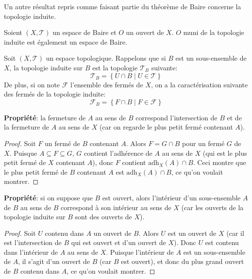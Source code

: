 Un autre résultat repris comme faisant partie du théorème de Baire concerne
la topologie induite.
\begin{thm}\label{baire:ind}
  Soient $(X, \mathcal{T})$ un espace de Baire et $O$ un ouvert de $X$.
  $O$ muni de la topologie induite est également un espace de Baire.
\end{thm}

\begin{rem}[Rappels]
  Soit $(X, \mathcal{T})$ un espace topologique.
  Rappelons que si $B$ est un sous-ensemble de $X$, la topologie
  induite sur $B$ est la topologie $\mathcal{T}_B$ suivante:
  $$\mathcal{T}_B=\left\{U\cap B\mid U\in\mathcal{T}\right\}$$
  De plus, si on note $\mathcal{F}$ l'ensemble des fermés de $X$,
  on a la caractérisation suivante des fermés de la topologie
  induite:
  $$\mathcal{F}_B=\left\{F\cap B\mid F\in\mathcal{F}\right\}$$

  \textbf{Propriété}: la fermeture de $A$ au sens de $B$ correspond
  l'intersection de $B$ et de la fermeture de $A$ au sens
  de $X$ (car on regarde le plus petit fermé contenant $A$).

  \begin{proof}
  Soit $F$ un fermé de $B$ contenant $A$. Alors
  $F = G\cap B$ pour un fermé $G$ de $X$.
  Puisque $ A \subseteq F\subseteq G$, $G$ contient
  l'adhérence de $A$ au sens de $X$
  (qui est le plus petit fermé de $X$
  contenant $A$), donc $F$ contient $\mathrm{adh}_X(A)\cap B$.
  Ceci montre que le plus petit fermé de $B$ contenant $A$
  est $\mathrm{adh}_X(A)\cap B$, ce qu'on voulait montrer.
\end{proof}

  \textbf{Propriété}: si on suppose que $B$ est ouvert, alors l'intérieur d'un
  sous-ensemble $A$ de $B$ au sens de $B$ correspond à
  son intérieur au sens de $X$
  (car les ouverts de la topologie induite sur $B$ sont des
  ouverts de $X$).

  \begin{proof}
    Soit $U$ contenu dans $A$ un ouvert de $B$. Alors $U$ est un
    ouvert de $X$ (car il est l'intersection de $B$ qui est ouvert
    et d'un ouvert de $X$). Donc $U$ est contenu dans l'intérieur
    de $A$ au sens de $X$. Puisque l'intérieur de $A$ est un sous-ensemble
    de $A$, il s'agit d'un ouvert de $B$ (car $B$ est ouvert),
    et donc du plus grand
    ouvert de $B$ contenu dans $A$, ce qu'on voulait montrer.
    \end{proof}
\end{rem}


